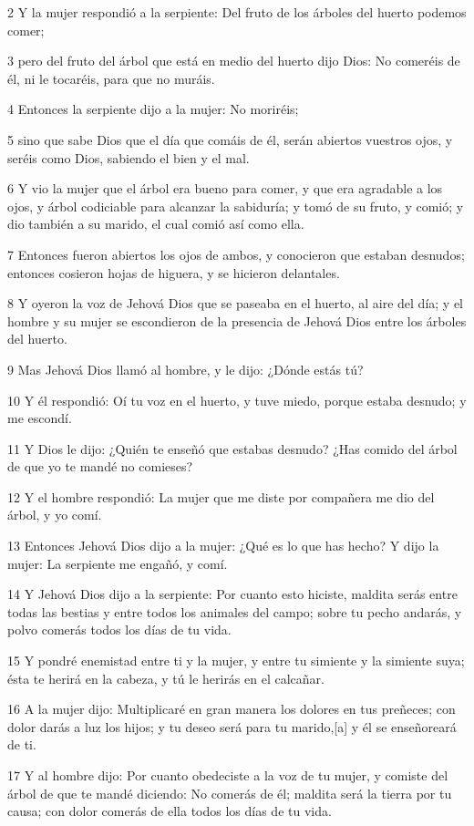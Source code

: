 2 Y la mujer respondió a la serpiente: Del fruto de los árboles del huerto podemos comer;

3 pero del fruto del árbol que está en medio del huerto dijo Dios: No comeréis de él, ni le tocaréis, para que no muráis.

4 Entonces la serpiente dijo a la mujer: No moriréis;

5 sino que sabe Dios que el día que comáis de él, serán abiertos vuestros ojos, y seréis como Dios, sabiendo el bien y el mal.

6 Y vio la mujer que el árbol era bueno para comer, y que era agradable a los ojos, y árbol codiciable para alcanzar la sabiduría; y tomó de su fruto, y comió; y dio también a su marido, el cual comió así como ella.

7 Entonces fueron abiertos los ojos de ambos, y conocieron que estaban desnudos; entonces cosieron hojas de higuera, y se hicieron delantales.

8 Y oyeron la voz de Jehová Dios que se paseaba en el huerto, al aire del día; y el hombre y su mujer se escondieron de la presencia de Jehová Dios entre los árboles del huerto.

9 Mas Jehová Dios llamó al hombre, y le dijo: ¿Dónde estás tú?

10 Y él respondió: Oí tu voz en el huerto, y tuve miedo, porque estaba desnudo; y me escondí.

11 Y Dios le dijo: ¿Quién te enseñó que estabas desnudo? ¿Has comido del árbol de que yo te mandé no comieses?

12 Y el hombre respondió: La mujer que me diste por compañera me dio del árbol, y yo comí.

13 Entonces Jehová Dios dijo a la mujer: ¿Qué es lo que has hecho? Y dijo la mujer: La serpiente me engañó, y comí.

14 Y Jehová Dios dijo a la serpiente: Por cuanto esto hiciste, maldita serás entre todas las bestias y entre todos los animales del campo; sobre tu pecho andarás, y polvo comerás todos los días de tu vida.

15 Y pondré enemistad entre ti y la mujer, y entre tu simiente y la simiente suya; ésta te herirá en la cabeza, y tú le herirás en el calcañar.

16 A la mujer dijo: Multiplicaré en gran manera los dolores en tus preñeces; con dolor darás a luz los hijos; y tu deseo será para tu marido,[a] y él se enseñoreará de ti.

17 Y al hombre dijo: Por cuanto obedeciste a la voz de tu mujer, y comiste del árbol de que te mandé diciendo: No comerás de él; maldita será la tierra por tu causa; con dolor comerás de ella todos los días de tu vida.

